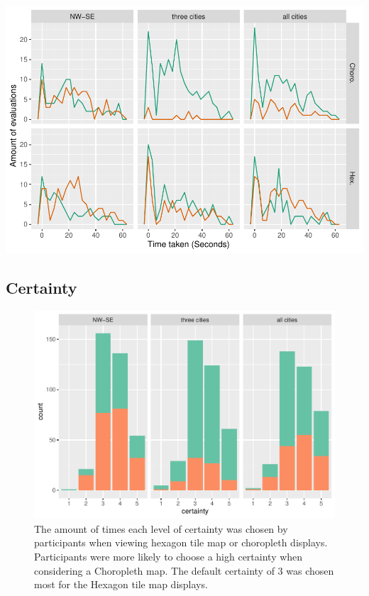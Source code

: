 \documentclass[conference,final,]{IEEEtran}
\makeatletter
\def\maxwidth{\ifdim\Gin@nat@width>\linewidth\linewidth
\else\Gin@nat@width\fi}
\let\Oldincludegraphics\includegraphics
\renewcommand{\includegraphics}[1]{\Oldincludegraphics[width=\maxwidth]{#1}}
\makeatother
\begin{document}
\includegraphics{paper_files/figure-latex/unnamed-chunk-1-1.pdf}

\hypertarget{certainty}{%
\subsection{Certainty}\label{certainty}}

\begin{figure}
\centering
\includegraphics{paper_files/figure-latex/unnamed-chunk-2-1.pdf}
\caption{The amount of times each level of certainty was chosen by
participants when viewing hexagon tile map or choropleth displays.
Participants were more likely to choose a high certainty when
considering a Choropleth map. The default certainty of 3 was chosen most
for the Hexagon tile map displays.}
\end{figure}
\end{document}
